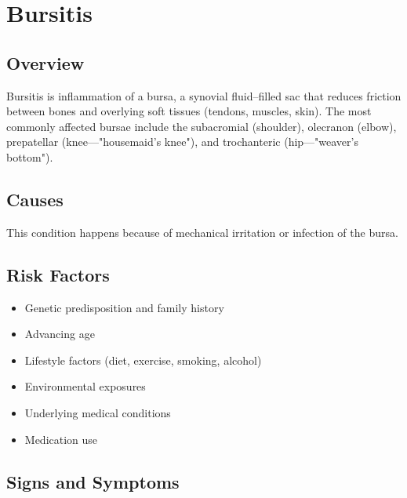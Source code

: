\chapter{Bursitis}
\label{sec:Bursitis}

\section{Overview}
Bursitis is inflammation of a bursa, a synovial fluid--filled sac that reduces friction between bones and overlying soft tissues (tendons, muscles, skin). The most commonly affected bursae include the subacromial (shoulder), olecranon (elbow), prepatellar (knee---"housemaid's knee"), and trochanteric (hip---"weaver's bottom").
\section{Causes}
This condition happens because of mechanical irritation or infection of the bursa.     
\section{Risk Factors}

\begin{itemize}[noitemsep]
  \item Genetic predisposition and family history
  \item Advancing age
  \item Lifestyle factors (diet, exercise, smoking, alcohol)
  \item Environmental exposures
  \item Underlying medical conditions
  \item Medication use
\end{itemize}
\section{Signs and Symptoms}

